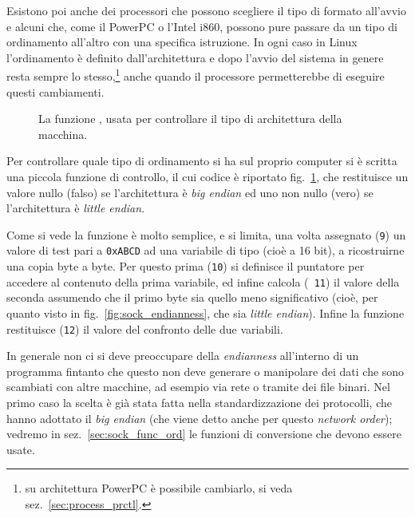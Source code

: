 Esistono poi anche dei processori che possono scegliere il tipo di formato
all'avvio e alcuni che, come il PowerPC o l'Intel i860, possono pure passare
da un tipo di ordinamento all'altro con una specifica istruzione. In ogni caso
in Linux l'ordinamento è definito dall'architettura e dopo l'avvio del sistema
in genere resta sempre lo stesso,\footnote{su architettura PowerPC è possibile
  cambiarlo, si veda sez.~\ref{sec:process_prctl}.} anche quando il processore
permetterebbe di eseguire questi cambiamenti.

\begin{figure}[!htbp]
  \footnotesize \centering
  \begin{minipage}[c]{\codesamplewidth}
  \end{minipage} 
  \normalsize
  \caption{La funzione , usata per controllare il tipo di
    architettura della macchina.}
  \label{fig:sock_endian_code}
\end{figure}

Per controllare quale tipo di ordinamento si ha sul proprio computer si è
scritta una piccola funzione di controllo, il cui codice è riportato
fig.~\ref{fig:sock_endian_code}, che restituisce un valore nullo (falso) se
l'architettura è \textit{big endian} ed uno non nullo (vero) se l'architettura
è \textit{little endian}.

Come si vede la funzione è molto semplice, e si limita, una volta assegnato
(\texttt{\small 9}) un valore di test pari a \texttt{0xABCD} ad una variabile
di tipo  (cioè a 16 bit), a ricostruirne una copia byte a byte.
Per questo prima (\texttt{\small 10}) si definisce il puntatore  per
accedere al contenuto della prima variabile, ed infine calcola (\texttt{\small
  11}) il valore della seconda assumendo che il primo byte sia quello meno
significativo (cioè, per quanto visto in fig.~\ref{fig:sock_endianness}, che sia
\textit{little endian}). Infine la funzione restituisce (\texttt{\small 12})
il valore del confronto delle due variabili. 

In generale non ci si deve preoccupare della \textit{endianness} all'interno
di un programma fintanto che questo non deve generare o manipolare dei dati
che sono scambiati con altre macchine, ad esempio via rete o tramite dei file
binari. Nel primo caso la scelta è già stata fatta nella standardizzazione dei
protocolli, che hanno adottato il \textit{big endian} (che viene detto anche
per questo \textit{network order}); vedremo in sez.~\ref{sec:sock_func_ord} le
funzioni di conversione che devono essere usate.

